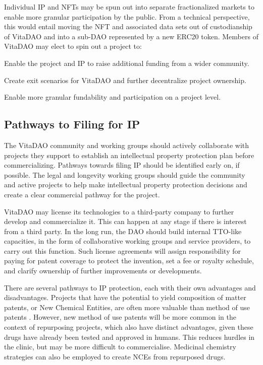\documentclass[10pt,letterpaper]{article}
\newenvironment{tight_enumerate}{
\begin{enumerate}
  \setlength{\itemsep}{0pt}
  \setlength{\parskip}{0pt}
}{\end{enumerate}}
\begin{document}
Individual IP and NFTs may be spun out into separate fractionalized markets to enable more granular participation by the public. From a technical perspective, this would entail moving the NFT and associated data sets out of custodianship of VitaDAO and into a sub-DAO represented by a new ERC20 token. Members of VitaDAO may elect to spin out a project to:

\begin{tight_enumerate}
\item Enable the project and IP to raise additional funding from a wider community.
\item Create exit scenarios for VitaDAO and further decentralize project ownership.
\item Enable more granular fundability and participation on a project level.
\end{tight_enumerate}

\subsection{Pathways to Filing for IP}
The VitaDAO community and working groups should actively collaborate with projects they support to establish an intellectual property protection plan before commercializing. Pathways towards filing IP should be identified early on, if possible. The legal and longevity working groups should guide the community and active projects to help make intellectual property protection decisions and create a clear commercial pathway for the project.

VitaDAO may license its technologies to a third-party company to further develop and commercialize it. This can happen at any stage if there is interest from a third party. In the long run, the DAO should build internal TTO-like capacities, in the form of collaborative working groups and service providers, to carry out this function. Such license agreements will assign responsibility for paying for patent coverage to protect the invention, set a fee or royalty schedule, and clarify ownership of further improvements or developments.

There are several pathways to IP protection, each with their own advantages and disadvantages. Projects that have the potential to yield composition of matter patents, or New Chemical Entities, are often more valuable than method of use patents \citep{BlackBox}. However, new method of use patents will be more common in the context of repurposing projects, which also have distinct advantages, given these drugs have already been tested and approved in humans. This reduces hurdles in the clinic, but may be more difficult to commercialise. Medicinal chemistry strategies can also be employed to create NCEs from repurposed drugs. 
\end{document}
